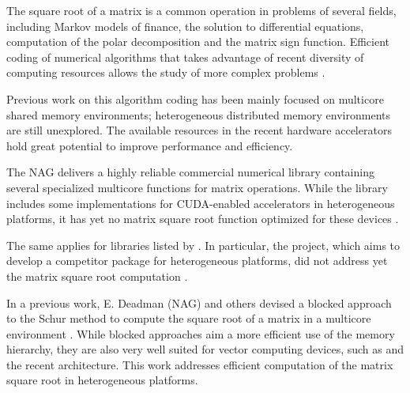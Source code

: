 

The square root of a matrix is a common operation in problems of several fields, including Markov models of finance, the solution to differential equations, computation of the polar decomposition and the matrix sign function. Efficient coding of numerical algorithms that takes advantage of recent diversity of computing resources allows the study of more complex problems \cite{Hill:Marty:2008}.

Previous work on this algorithm coding has been mainly focused on multicore shared memory environments; heterogeneous distributed memory environments are still unexplored. The available resources in the recent hardware accelerators hold great potential to improve performance and efficiency.

The \acf{NAG}\cite{NAG} delivers a highly reliable commercial numerical library containing several specialized multicore functions for matrix operations. While the \nag library includes some implementations for CUDA-enabled \gpu accelerators in heterogeneous platforms, it has yet no matrix square root function optimized for these devices \cite{NAG:GPU:0:6}.

The same applies for \gpu libraries listed by \nvidia \cite{ACCELEREYES:WIKI:SQRTM,CULA:LAPACK,NVIDIA:CUBLAS:5:0,NVIDIA:CUSPARSE:5:0,CUSP:FEATURES}.
In particular, the \magma project, which aims to develop a \lapack competitor package for heterogeneous platforms, did not address yet the matrix square root computation \cite{PLASMA:MAGMA}.

In a previous work, E. Deadman (NAG) and others devised a blocked approach to the Schur method to compute the square root of a matrix in a multicore environment \cite{Deadman:Higham:Ralha:2013}. While blocked approaches aim a more efficient use of the memory hierarchy, they are also very well suited for vector computing devices, such as \gpus and the recent \intel\mic architecture. This work addresses efficient computation of the matrix square root in heterogeneous platforms.
